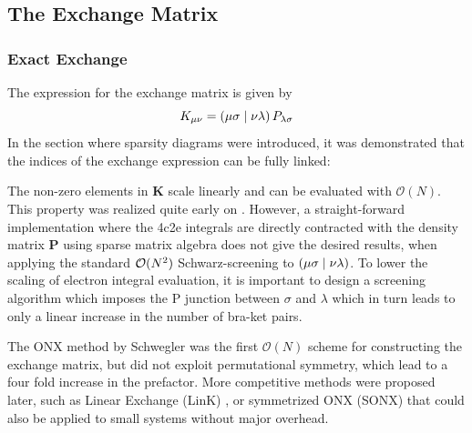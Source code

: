 \subsection{The Exchange Matrix}

\subsubsection{Exact Exchange}

The expression for the exchange matrix is given by 
\begin{equation}
K_{\mu\nu} = \left( \mu\sigma \mid \nu\lambda \right) P_{\lambda\sigma}
\end{equation}
\noindent In the section where sparsity diagrams were introduced, it was demonstrated that the indices of the exchange expression can be fully linked:
\begin{center}
\end{center}
\noindent The non-zero elements in $\mathbf{K}$ scale linearly and can be evaluated with $\mathcal{O}(N)$. This property was realized quite early on \cite{Sch1997}. However, a straight-forward implementation where the 4c2e integrals are directly contracted with the density matrix $\mathbf{P}$ using sparse matrix algebra does not give the desired results, when applying the standard $\mathcal{O}(N^{2})$ Schwarz-screening to $\left( \mu\sigma \mid \nu\lambda \right)$. To lower the scaling of electron integral evaluation, it is important to design a screening algorithm which imposes the P junction between $\sigma$ and $\lambda$ which in turn leads to only a linear increase in the number of bra-ket pairs. 

The ONX method by Schwegler \cite{Sch1997} was the first $\mathcal{O}(N)$ scheme for constructing the exchange matrix, but did not exploit permutational symmetry, which lead to a four fold increase in the prefactor. More competitive methods were proposed later, such as Linear Exchange (LinK) \cite{Och1998}, or symmetrized ONX (SONX) \cite{Sch2000} that could also be applied to small systems without major overhead.

